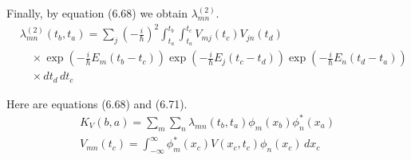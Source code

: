 Finally, by equation (6.68) we obtain $\lambda_{mn}^{(2)}$.
\begin{align*}
&\lambda_{mn}^{(2)}(t_b,t_a)=\sum_j\left(-\frac{i}{\hbar}\right)^2
\int_{t_a}^{t_b}
\int_{t_a}^{t_c}
V_{mj}(t_c)V_{jn}(t_d)
\\
&\quad{}\times
\exp\left(-\frac{i}{\hbar}E_m(t_b-t_c)\right)
\exp\left(-\frac{i}{\hbar}E_j(t_c-t_d)\right)
\exp\left(-\frac{i}{\hbar}E_n(t_d-t_a)\right)
\\
&\quad{}\times dt_d\,dt_c
\end{align*}

Here are equations (6.68) and (6.71).
\begin{gather*}
K_V(b,a)=\sum_m\sum_n\lambda_{mn}(t_b,t_a)\phi_m(x_b)\phi_n^*(x_a)\tag{6.68}
\\
V_{mn}(t_c)=\int_{-\infty}^\infty\phi_m^*(x_c)V(x_c,t_c)\phi_n(x_c)\,dx_c\tag{6.71}
\end{gather*}


